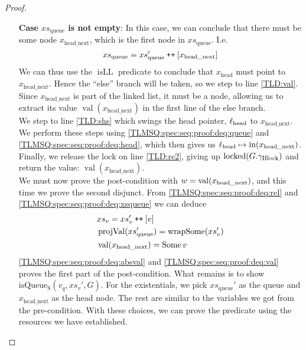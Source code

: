 \documentclass[a4paper, 10pt]{report}
\theoremstyle{definition}
\newcommand{\locked}{\operatorname{locked}}
\newcommand{\isqueueseq}{\operatorname{isQueue_{S}}}
\newcommand{\vq}{v_q}
\newcommand{\xsqueue}{xs_{\mathrm{queue}}}
\newcommand{\isLL}{\operatorname{isLL}}
\newcommand{\projval}{\operatorname{projVal}}
\newcommand{\wrapsome}{\operatorname{wrapSome}}
\newcommand{\locN}[1]{\loc_{\mathrm{#1}}}
\newcommand{\lochead}{\locN{head}}
\newcommand{\nodeval}{\valB}
\newcommand{\nIn}[1]{\operatorname{in}(#1)}
\newcommand{\nVal}[1]{\operatorname{val}(#1)}
\newcommand{\node}{x}
\newcommand{\nodeN}[1]{\node_{\mathrm{#1}}}
\newcommand{\nodehead}{\nodeN{head}}
\newcommand{\nodeheadnext}{\nodeN{head\_next}}
\newcommand{\absvalue}{\val}
\newcommand{\absvalueList}{xs_v}
\newcommand{\Qg}{G}
\newcommand{\ghlock}{\gname_{\mathrm{Hlock}}}
\newcommand\catenate{\mathbin{\text{\ttfamily\upshape ++}}}
\begin{document}
\begin{proof}
\begin{itemize}
  In this case, \ref{TLMSQ:spec:seq:proof:deq:isLL} simply asserts $\isLL [\nodehead]$, which by definition tells us that $\nodehead \mapsto \None$. Hence, the ``if'' on line \ref{TLD:ifn} will take the ``then'' branch, so we step to line \ref{TLD:re1}. Here we release the lock, giving up $\locked(\Qg.\ghlock)$, and return $\None$ on the next line. What remains is to prove the post-condition with $\nodeval = \None$. We can easily do this by proving the first disjunction. From \ref{TLMSQ:spec:seq:proof:deq:rel} with the fact that $\xsqueue = []$ we can conclude that $\absvalueList$ is empty, and since we haven't modified the queue, we can prove $\isqueueseq(\vq, \absvalueList, \Qg)$ using the same resources we got from the pre-condition.

  \item[\textbf{Case}] \textbf{$\xsqueue$ is not empty}:
  In this case, we can conclude that there must be some node $\nodeheadnext$, which is the first node in $\xsqueue$. I.e.
  \begin{equation}
    \xsqueue = \xsqueue' \catenate [\nodeheadnext]\label{TLMSQ:spec:seq:proof:deq:xsqueue}
  \end{equation}
  We can thus use the $\isLL$ predicate to conclude that $\nodehead$ must point to $\nodeheadnext$. Hence the ``else'' branch will be taken, so we step to line \ref{TLD:val}. Since $\nodeheadnext$ is part of the linked list, it must be a node, allowing us to extract its value $\nVal{\nodeheadnext}$ in the first line of the else branch.\\
  We step to line \ref{TLD:shs} which swings the head pointer, $\lochead$ to $\nodeheadnext$. We perform these steps using \ref{TLMSQ:spec:seq:proof:deq:queue} and \ref{TLMSQ:spec:seq:proof:deq:head}, which then gives us $\lochead \mapsto \nIn{\nodeheadnext}$.\\
  Finally, we release the lock on line \ref{TLD:re2}, giving up $\locked(\Qg.\ghlock)$ and return the value: $\nVal{\nodeheadnext}$.\\
  We must now prove the post-condition with $\nodeval = \nVal{\nodeheadnext}$, and this time we prove the second disjunct. From \ref{TLMSQ:spec:seq:proof:deq:rel} and \ref{TLMSQ:spec:seq:proof:deq:xsqueue} we can deduce
  \begin{align}
    &\absvalueList = \absvalueList' \catenate [\absvalue]\label{TLMSQ:spec:seq:proof:deq:absval}\\
    &\projval(\xsqueue') = \wrapsome(\absvalueList')\label{TLMSQ:spec:seq:proof:deq:rel'}\\
    &\nVal{\nodeheadnext} = \Some{\absvalue}\label{TLMSQ:spec:seq:proof:deq:val}
  \end{align}
  \ref{TLMSQ:spec:seq:proof:deq:absval} and \ref{TLMSQ:spec:seq:proof:deq:val} proves the first part of the post-condition. What remains is to show $\isqueueseq(\vq, \absvalueList', \Qg)$. For the existentials, we pick $\xsqueue'$ as the queue and $\nodeheadnext$ as the head node. The rest are similar to the variables we got from the pre-condition. With these choices, we can prove the predicate using the resources we have established.
\end{itemize}
\end{proof}
\end{document}
